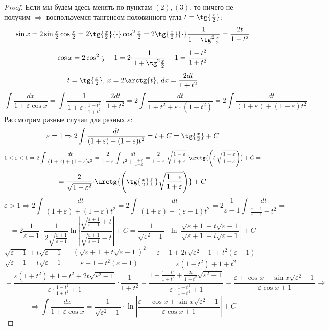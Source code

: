 \documentclass[12pt]{article}
\newcommand{\VE}{\varepsilon}
\theoremstyle{definition}
\DeclareMathOperator{\dint}{\displaystyle\int}
\begin{document}
\begin{proof}
	Если мы будем здесь менять по пунктам $(2), (3)$, то ничего не получим $\Rightarrow$ воспользуемся тангенсом половинного угла $t = \tg{\tfrac{x}{2}}$:
	$$
		\sin{x} = 2\sin{\tfrac{x}{2}}\cos{\tfrac{x}{2}} = 2\tg{\tfrac{x}{2}}{\cdot}\cos^2{\tfrac{x}{2}} = 2\tg{\tfrac{x}{2}}{\cdot}\dfrac{1}{1 + \tg^2{\tfrac{x}{2}}} = \dfrac{2t}{1 + t^2}
	$$
	$$
		\cos{x} = 2\cos^2{\tfrac{x}{2}} - 1 = 2{\cdot}\dfrac{1}{1 + \tg^2{\tfrac{x}{2}}} - 1 = \dfrac{1 - t^2}{1 + t^2}
	$$
	$$
		t = \tg{\tfrac{x}{2}}, \, x = 2 \arctg{t}, \, dx = \dfrac{2dt}{1 + t^2}
	$$
	$$
		\dint\dfrac{dx}{1 + \VE \cos{x}} = \dint \dfrac{1}{1 + \VE{\cdot}\tfrac{ 1- t^2}{1 +t^2}}{\cdot}\dfrac{2dt}{1 + t^2} = 2\dint  \dfrac{dt}{1 + t^2 + \VE{\cdot}(1 - t^2)} = 2\dint\dfrac{dt}{(1 + \VE) + (1 - \VE)t^2}
	$$
	Рассмотрим разные случаи для разных $\VE$:
	$$
		\VE = 1 \Rightarrow 2\dint\dfrac{dt}{(1 + \VE) + (1 - \VE)t^2} = t + C = \tg{\tfrac{x}{2}} + C
	$$
	$$
		0 < \VE < 1 \Rightarrow  2\dint\dfrac{dt}{(1 + \VE) + (1 - \VE)t^2}  = \dfrac{2}{1 -\VE}\dint\dfrac{dt}{t^2 + \tfrac{1 + \VE}{1 -\VE}} = \dfrac{2}{1 -\VE}{\cdot}\sqrt{\dfrac{1-\VE}{1 + \VE}}{\cdot}\arctg{\left(t{\cdot}\sqrt{\dfrac{1 - \VE}{1+\VE}}\right)} + C =
	$$
	$$
		=	\dfrac{2}{\sqrt{1 - \VE^2}}{\cdot}\arctg{
			\left(
				\tg{\tfrac{x}{2}}{\cdot}
				\sqrt{
						\dfrac{1 - \VE}{1+\VE}
					}
			\right)} + C
	$$
	$$
		\VE > 1 \Rightarrow  2\dint\dfrac{dt}{(1 + \VE) + (1 - \VE)t^2} = 2\dint\dfrac{dt}{(1 + \VE) - (\VE - 1)t^2} = 2\dfrac{1}{\VE - 1}\dint\dfrac{dt}{\tfrac{\VE+1}{\VE - 1} - t^2} =
	$$
	$$
		= 2\dfrac{1}{\VE - 1}{\cdot}\dfrac{1}{2 \sqrt{\tfrac{\VE+1}{\VE - 1}}}\ln{\left| \dfrac{\sqrt{\tfrac{\VE+1}{\VE - 1}}  + t}{\sqrt{\tfrac{\VE+1}{\VE - 1}} - t}\right|} + C = \dfrac{1}{\sqrt{\VE^2 -1}}{\cdot}\ln{\left| \dfrac{\sqrt{\VE + 1} +t\sqrt{\VE - 1}}{\sqrt{\VE + 1} - t\sqrt{\VE -1}}\right|} +C
	$$
	$$
		\dfrac{\sqrt{\VE + 1} +t\sqrt{\VE - 1}}{\sqrt{\VE + 1} - t\sqrt{\VE -1}} = \dfrac{(\sqrt{\VE + 1} +t\sqrt{\VE - 1})^2}{\VE + 1 -t^2(\VE -1)} = \dfrac{\VE + 1 + 2t\sqrt{\VE^2 -1} + t^2(\VE - 1)}{\VE(1 -t^2) + 1 + t^2} =
	$$
	$$
		=	\dfrac{\VE(1 + t^2) + 1 -t^2 + 2t\sqrt{\VE^2 -1}}{\VE{\cdot}\tfrac{1-t^2}{1+t^2} + 1}{\cdot}\dfrac{1}{1+t^2} = \dfrac{1 + \tfrac{1 -t^2}{1+t^2} + \tfrac{2t}{1+t^2}\sqrt{\VE^2-1}}{\VE{\cdot}\tfrac{1-t^2}{1+t^2} + 1} = \dfrac{\VE + \cos{x} + \sin{x}\sqrt{\VE^2-1}}{\VE \cos{x} + 1} \Rightarrow
	$$
	$$
		\Rightarrow \dint\dfrac{dx}{1 + \VE \cos{x}} = \dfrac{1}{\sqrt{\VE^2 -1}}{\cdot}\ln{\left| \dfrac{\VE + \cos{x} + \sin{x}\sqrt{\VE^2-1}}{\VE \cos{x} + 1}\right|} +C
	$$
\end{proof}
\end{document}
